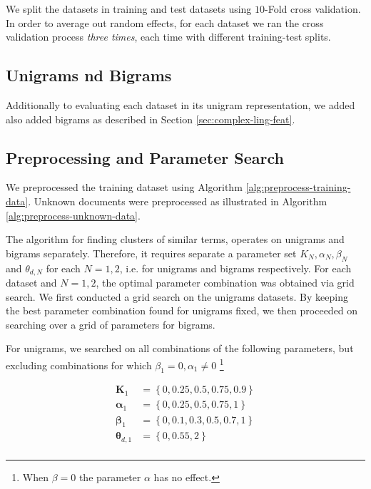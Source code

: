 We split the datasets in training and test datasets using $10$-Fold cross validation.
In order to average out random effects, for each dataset we ran the cross validation process 
\emph{three times}, each time with different training-test splits.

\subsection{Unigrams nd Bigrams}

Additionally to evaluating each dataset in its unigram representation, we added 
also added bigrams as described in Section \ref{sec:complex-ling-feat}. 

\subsection{Preprocessing and Parameter Search}
\label{ssec:preprocessing-parameter-search}
We preprocessed the training dataset using Algorithm \ref{alg:preprocess-training-data}. 
Unknown documents were preprocessed as illustrated in Algorithm \ref{alg:preprocess-unknown-data}. 

The algorithm for finding clusters of similar terms, operates on unigrams and bigrams separately.
Therefore, it requires separate a parameter set $K_N, \alpha_N, \beta_N$ and $\theta_{d,N}$ for each $N=1,2$, i.e.
for unigrams and bigrams respectively. For each dataset and $N=1,2$, the optimal parameter combination was obtained via grid search.
We first conducted a grid search on the unigrams datasets. 
By keeping the best parameter combination found for unigrams fixed, we then proceeded on searching over a grid of parameters for bigrams.

For unigrams, we searched on all combinations of the following parameters, but excluding 
combinations for which $\beta_1 = 0,\alpha_1 \neq 0$ \footnote{When $\beta=0$ the parameter $\alpha$ has no effect.} 

\begin{equation*}
\begin{split}
	\boldsymbol K_1 &= \left\{ 0, 0.25, 0.5, 0.75, 0.9 \right\} \\
	\boldsymbol \alpha_1 &= \left\{ 0, 0.25, 0.5, 0.75, 1 \right\} \\
	\boldsymbol \beta_1 &= \left\{0, 0.1, 0.3, 0.5, 0.7, 1 \right\} \\
	\boldsymbol \theta_{d,1} &= \left\{ 0, 0.55, 2 \right \} \\	
\end{split}	      
\end{equation*} 

